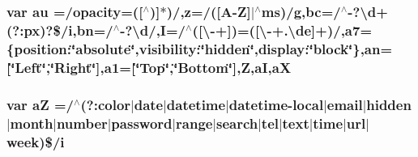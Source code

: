 \subsubsection[{au}]{\setlength{\rightskip}{0pt plus 5cm}var au =/opacity=(\mbox{[}$^\wedge$)\mbox{]}$\ast$)/,z=/(\mbox{[}A-\/{\bf Z}\mbox{]}$\vert$$^\wedge$ms)/g,bc=/$^\wedge$-\/?\textbackslash{}d+(?\+:px)?\$/i,bn=/$^\wedge$-\/?\textbackslash{}d/,I=/$^\wedge$(\mbox{[}\textbackslash{}-\/+\mbox{]})=(\mbox{[}\textbackslash{}-\/+.\textbackslash{}de\mbox{]}+)/,a7=\{position\+:\char`\"{}absolute\char`\"{},visibility\+:\char`\"{}hidden\char`\"{},display\+:\char`\"{}block\char`\"{}\},an=\mbox{[}\char`\"{}Left\char`\"{},\char`\"{}Right\char`\"{}\mbox{]},a1=\mbox{[}\char`\"{}Top\char`\"{},\char`\"{}Bottom\char`\"{}\mbox{]},Z,a\+I,a\+X}\label{docs_2_programmer's_manual_2html_2jquery_8js_a4fd8ddfab07c8d7c7cae0ab0e052cad3}
\hypertarget{docs_2_programmer's_manual_2html_2jquery_8js_ac87125cdee1a5e57da4ef619af49bc7d}{}
\subsubsection[{a\+Z}]{\setlength{\rightskip}{0pt plus 5cm}var a\+Z =/$^\wedge$(?\+:color$\vert$date$\vert$datetime$\vert$datetime-\/local$\vert$email$\vert$hidden$\vert$month$\vert$number$\vert$password$\vert$range$\vert$search$\vert$tel$\vert$text$\vert$time$\vert$url$\vert$week)\$/i}\label{docs_2_programmer's_manual_2html_2jquery_8js_ac87125cdee1a5e57da4ef619af49bc7d}
\hypertarget{docs_2_programmer's_manual_2html_2jquery_8js_aa4026ad5544b958e54ce5e106fa1c805}{}
